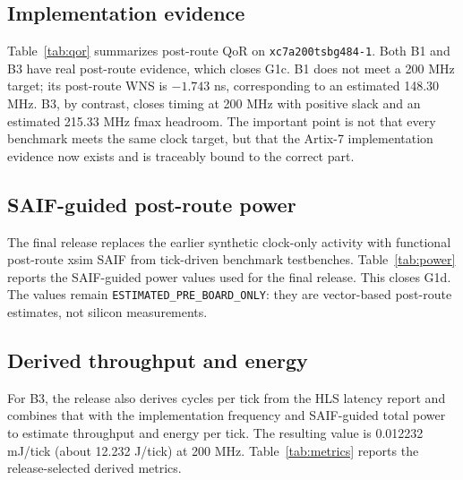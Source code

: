 \documentclass[11pt]{article}
\begin{document}
\begin{table}[t]
\centering
\small
\resizebox{\linewidth}{!}{}
\caption{Strict HLS digest parity for the required benches. B3 denotes the canonical structural benchmark \texttt{B3\_varshney\_exec\_expanded\_gap\_300\_5824}.}
\label{tab:hls}
\end{table}

\subsection{Implementation evidence}
Table~\ref{tab:qor} summarizes post-route QoR on \texttt{xc7a200tsbg484-1}. Both B1 and B3 have real post-route evidence, which closes G1c. B1 does not meet a 200 MHz target; its post-route WNS is $-1.743$ ns, corresponding to an estimated 148.30 MHz. B3, by contrast, closes timing at 200 MHz with positive slack and an estimated 215.33 MHz fmax headroom. The important point is not that every benchmark meets the same clock target, but that the Artix-7 implementation evidence now exists and is traceably bound to the correct part.

\begin{table}[t]
\centering
\small
\resizebox{\linewidth}{!}{}
\caption{Post-route QoR on Artix-7 part \texttt{xc7a200tsbg484-1}.}
\label{tab:qor}
\end{table}

\subsection{SAIF-guided post-route power}
The final release replaces the earlier synthetic clock-only activity with functional post-route xsim SAIF from tick-driven benchmark testbenches. Table~\ref{tab:power} reports the SAIF-guided power values used for the final release. This closes G1d. The values remain \texttt{ESTIMATED\_PRE\_BOARD\_ONLY}: they are vector-based post-route estimates, not silicon measurements.

\begin{table}[t]
\centering
\small
\resizebox{\linewidth}{!}{}
\caption{SAIF-guided post-route power estimates from functional xsim simulation.}
\label{tab:power}
\end{table}

\subsection{Derived throughput and energy}
For B3, the release also derives cycles per tick from the HLS latency report and combines that with the implementation frequency and SAIF-guided total power to estimate throughput and energy per tick. The resulting value is 0.012232 mJ/tick (about 12.232 \textmu J/tick) at 200 MHz. Table~\ref{tab:metrics} reports the release-selected derived metrics.
\end{document}
